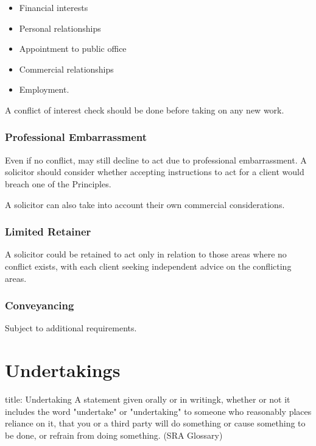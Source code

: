 \documentclass[
]{article}
\newenvironment{Shaded}{}{}
\newcommand{\NormalTok}[1]{#1}
\providecommand{\tightlist}{%
  \setlength{\itemsep}{0pt}\setlength{\parskip}{0pt}}
\begin{document}
\begin{itemize}
\tightlist
\item
  Financial interests
\item
  Personal relationships
\item
  Appointment to public office
\item
  Commercial relationships
\item
  Employment.
\end{itemize}

A conflict of interest check should be done before taking on any new
work.

\hypertarget{professional-embarrassment-1}{%
\subsubsection{Professional
Embarrassment}\label{professional-embarrassment-1}}

Even if no conflict, may still decline to act due to professional
embarrassment. A solicitor should consider whether accepting
instructions to act for a client would breach one of the Principles.

A solicitor can also take into account their own commercial
considerations.

\hypertarget{limited-retainer}{%
\subsubsection{Limited Retainer}\label{limited-retainer}}

A solicitor could be retained to act only in relation to those areas
where no conflict exists, with each client seeking independent advice on
the conflicting areas.

\hypertarget{conveyancing}{%
\subsubsection{Conveyancing}\label{conveyancing}}

Subject to additional requirements.

\hypertarget{undertakings}{%
\section{Undertakings}\label{undertakings}}

\begin{Shaded}
\begin{Highlighting}[]
\NormalTok{title: Undertaking}
\NormalTok{A statement given orally or in writingk, whether or not it includes the word "undertake" or "undertaking" to someone who reasonably places reliance on it, that you or a third party will do something or cause something to be done, or refrain from doing something. (SRA Glossary)}
\end{Highlighting}
\end{Shaded}
\end{document}

